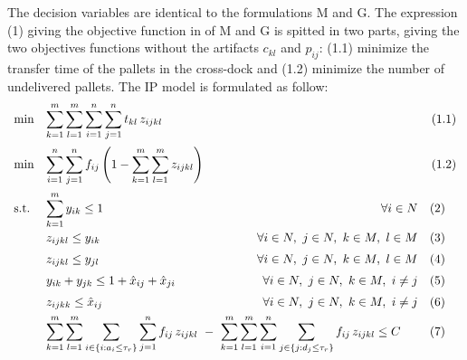 \documentclass[preprint,12pt,authoryear]{elsarticle}
\begin{document}
The decision variables are identical to the formulations M and G.
%
The expression (1) giving the objective function in of M and G is spitted in two parts, giving the two objectives functions without the artifacts $c_{kl}$ and $p_{ij}$:  (1.1) minimize the transfer time of the pallets in the cross-dock and (1.2) minimize the number of undelivered pallets. 
%
The IP model is formulated as follow: \\
\begin{equation*}
    \begin{array}{ll@{}ll}
    \text{min}  & \displaystyle\sum\limits^{m}_{k=1} \sum^{m}_{l=1} \sum^{n}_{i=1} \sum^{n}_{j=1} t_{kl} \, z_{ijkl} \  &  \hspace{4mm} (1.1) \vspace{2mm}\\
    \text{min} & \displaystyle\sum^{n}_{i=1} \sum^{n}_{j=1} f_{ij} \left( 1-\sum^{m}_{k=1} \sum^{m}_{l=1} z_{ijkl} \right)   &  \hspace{4mm} (1.2) \vspace{2mm}\\
    \text{s.t.}     & \displaystyle\sum\limits^{m}_{k=1} y_{ik} \leq 1   \hfill   \forall i \in N & \quad (2)\vspace{1mm}\\
                    & z_{ijkl} \leq y_{ik}   \hfill   \forall i\in N, \ j \in N, \ k \in M, \ l \in M & \quad (3)\vspace{2mm}\\
                    & z_{ijkl} \leq y_{jl}   \hfill   \forall i\in N, \ j \in N, \ k \in M, \ l \in M & \quad (4) \vspace{2mm}\\
                    & y_{ik} + y_{jk} \leq 1 + \hat{x}_{ij} + \hat{x}_{ji}   \hfill   \forall i\in N, \ j \in N, \ k \in M,  \ i \neq j & \quad (5)  \vspace{2mm}\\
                    & z_{ijkk} \leq \hat{x}_{ij}   \hfill   \forall i\in N, \ j \in N, \ k \in M, \  i \neq j &  \quad (6)  \vspace{1.5mm}\\
                    & \displaystyle\sum\limits_{k=1}^{m} \sum_{l=1}^{m} \sum_{i\in\{i:a_{i} \le \tau_r\}} \sum_{j=1}^{n} f_{ij} \, z_{ijkl} \ - \ \sum_{k=1}^{m} \sum_{l=1}^{m} \sum_{i=1}^{n} \sum_{j\in\{j:d_{j} \le \tau_r\}} f_{ij} \, z_{ijkl} \le  C \hspace{0.5cm} & \quad  (7)  \vspace{1mm}\\ 

\end{array}
\end{equation*}
\end{document}
